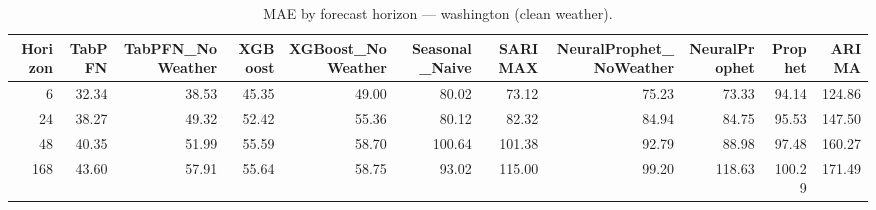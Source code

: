 \begin{table}[ht!]
\centering
\caption{MAE by forecast horizon — washington (clean weather).}
\label{tab:mae_by_horizon_washington}
\begin{tabular}{rrrrrrrrrrr}
\toprule
Horizon & TabPFN & TabPFN\_NoWeather & XGBoost & XGBoost\_NoWeather & Seasonal\_Naive & SARIMAX & NeuralProphet\_NoWeather & NeuralProphet & Prophet & ARIMA \\
\midrule
6 & 32.34 & 38.53 & 45.35 & 49.00 & 80.02 & 73.12 & 75.23 & 73.33 & 94.14 & 124.86 \\
24 & 38.27 & 49.32 & 52.42 & 55.36 & 80.12 & 82.32 & 84.94 & 84.75 & 95.53 & 147.50 \\
48 & 40.35 & 51.99 & 55.59 & 58.70 & 100.64 & 101.38 & 92.79 & 88.98 & 97.48 & 160.27 \\
168 & 43.60 & 57.91 & 55.64 & 58.75 & 93.02 & 115.00 & 99.20 & 118.63 & 100.29 & 171.49 \\
\bottomrule
\end{tabular}
\end{table}
